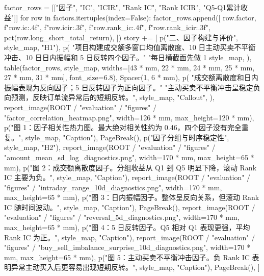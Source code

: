 \documentclass[UTF8,a4paper,fontset=fandol]{ctexart}
\begin{document}
\begin{ProjectCode}
{    factor_rows = [["因子", "IC", "ICIR", "Rank IC", "Rank ICIR", "Q5-Q1累计收益"]]
    for row in factors.itertuples(index=False):
        factor_rows.append([
            row.factor,
            f"{row.ic:.4f}",
            f"{row.icir:.3f}",
            f"{row.rank_ic:.4f}",
            f"{row.rank_icir:.3f}",
            pct(row.long_short_total_return),
        ])
    story += [
        p("二、因子构建与评价", style_map, "H1"),
        p(
            "项目构建成交额多窗口均值离散度、10 日主动买卖不平衡冲击、10 日日内振幅和 5 日反转四个因子。"
            "每日横截面先做 1%
            style_map,
        ),
        table(factor_rows, style_map, widths=[43 * mm, 22 * mm, 24 * mm, 25 * mm, 27 * mm, 31 * mm], font_size=6.8),
        Spacer(1, 6 * mm),
        p(
            "成交额离散度和日内振幅表现为反向因子；5 日反转因子为正向因子。"
            "主动买卖不平衡冲击呈稳定负向预测，反映订单流异常后的短期反转。",
            style_map,
            "Callout",
        ),
        report_image(ROOT / "evaluation" / "figures" / "factor_correlation_heatmap.png", width=126 * mm, max_height=120 * mm),
        p("图 1：因子相关性热力图。最大绝对相关性约为 0.46，四个因子没有完全重复。", style_map, "Caption"),
        PageBreak(),
        p("因子分组与时序稳定性", style_map, "H2"),
        report_image(ROOT / "evaluation" / "figures" / "amount_mean_sd_log_diagnostics.png", width=170 * mm, max_height=65 * mm),
        p("图 2：成交额离散度因子。分组收益从 Q1 到 Q5 明显下降，滚动 Rank IC 主要为负。", style_map, "Caption"),
        report_image(ROOT / "evaluation" / "figures" / "intraday_range_10d_diagnostics.png", width=170 * mm, max_height=65 * mm),
        p("图 3：日内振幅因子。整体呈反向关系，但滚动 Rank IC 随时间波动。", style_map, "Caption"),
        PageBreak(),
        report_image(ROOT / "evaluation" / "figures" / "reversal_5d_diagnostics.png", width=170 * mm, max_height=65 * mm),
        p("图 4：5 日反转因子。Q5 相对 Q1 表现更强，平均 Rank IC 为正。", style_map, "Caption"),
        report_image(ROOT / "evaluation" / "figures" / "buy_sell_imbalance_surprise_10d_diagnostics.png", width=170 * mm, max_height=65 * mm),
        p("图 5：主动买卖不平衡冲击因子。负 Rank IC 表明异常主动买入后更容易出现短期反转。", style_map, "Caption"),
        PageBreak(),
    ]

}
\end{ProjectCode}
\end{document}
